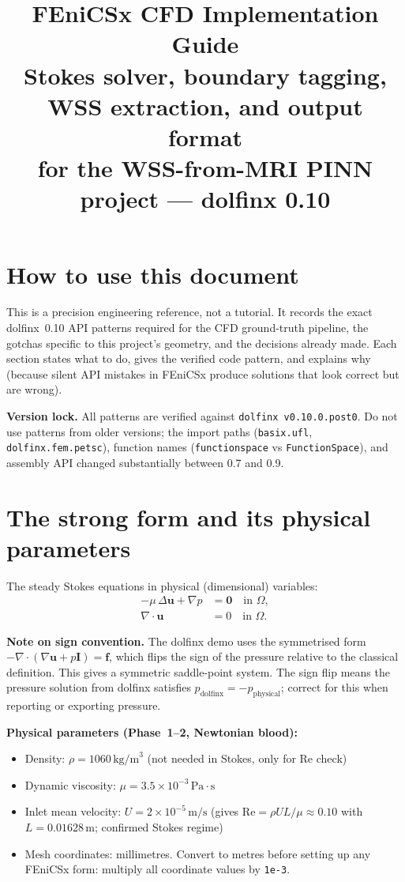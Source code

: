 \documentclass[11pt]{article}
\title{\bfseries FEniCSx CFD Implementation Guide\\[0.3em]
\large Stokes solver, boundary tagging, WSS extraction, and output format\\
for the WSS-from-MRI PINN project --- dolfinx 0.10}
\author{}
\date{}
\begin{document}
\maketitle

\section*{How to use this document}

This is a precision engineering reference, not a tutorial. It records
the exact dolfinx~0.10 API patterns required for the CFD ground-truth
pipeline, the gotchas specific to this project's geometry, and the
decisions already made. Each section states what to do, gives the
verified code pattern, and explains why (because silent API mistakes in
FEniCSx produce solutions that look correct but are wrong).

\textbf{Version lock.} All patterns are verified against
\texttt{dolfinx v0.10.0.post0}. Do not use patterns from older versions;
the import paths (\texttt{basix.ufl}, \texttt{dolfinx.fem.petsc}),
function names (\texttt{functionspace} vs \texttt{FunctionSpace}), and
assembly API changed substantially between 0.7 and 0.9.

\section{The strong form and its physical parameters}

The steady Stokes equations in physical (dimensional) variables:
\begin{align}
-\mu\,\Delta\mathbf{u} + \nabla p &= \mathbf{0} \quad \text{in } \Omega, \label{eq:stokes_mom}\\
\nabla\cdot\mathbf{u} &= 0 \quad \text{in } \Omega. \label{eq:stokes_cont}
\end{align}

\textbf{Note on sign convention.} The dolfinx demo uses the symmetrised form
$-\nabla\cdot(\nabla\mathbf{u} + p\mathbf{I}) = \mathbf{f}$, which flips the
sign of the pressure relative to the classical definition. This gives a
symmetric saddle-point system. The sign flip means the pressure solution
from dolfinx satisfies $p_{\text{dolfinx}} = -p_{\text{physical}}$; correct
for this when reporting or exporting pressure.

\textbf{Physical parameters (Phase~1--2, Newtonian blood):}
\begin{itemize}[noitemsep]
  \item Density: $\rho = 1060\,\text{kg/m}^3$ (not needed in Stokes, only for Re check)
  \item Dynamic viscosity: $\mu = 3.5\times10^{-3}\,\text{Pa}\cdot\text{s}$
  \item Inlet mean velocity: $U = 2\times10^{-5}\,\text{m/s}$
    (gives $\mathrm{Re} = \rho UL/\mu \approx 0.10$ with $L = 0.01628\,\text{m}$;
    confirmed Stokes regime)
  \item Mesh coordinates: millimetres. Convert to metres before setting up any
    FEniCSx form: multiply all coordinate values by \texttt{1e-3}.
\end{itemize}
\end{document}
